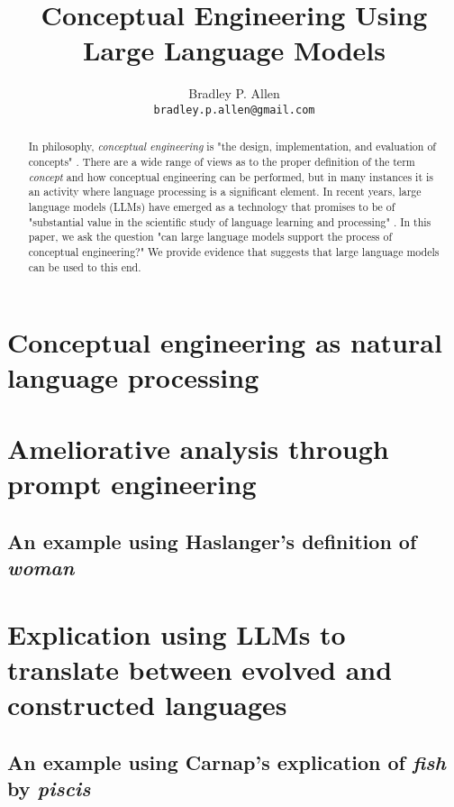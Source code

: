 \documentclass{article}
\title{Conceptual Engineering Using Large Language Models}
\author{Bradley P. Allen\\
\texttt{bradley.p.allen@gmail.com} \\
}
\begin{document}
\maketitle

\begin{abstract}
In philosophy, \textit{conceptual engineering} is "the design, implementation, and evaluation of concepts" \cite{chalmers2020conceptual}. There are a wide range of views as to the proper definition of the term \textit{concept} and how conceptual engineering can be performed, but in many instances it is an activity where language processing is a significant element. In recent years, large language models (LLMs) have emerged as a technology that promises to be of "substantial value in the scientific study of language learning and processing" \cite{mahowald2023dissociating}.  In this paper, we ask the question "can large language models support the process of conceptual engineering?" We provide evidence that suggests that large language models can be used to this end. 
\end{abstract}


\section{Conceptual engineering as natural language processing}

\section{Ameliorative analysis through prompt engineering}

\subsection{An example using Haslanger's definition of \textit{woman}}

\section{Explication using LLMs to translate between evolved and constructed languages}

\subsection{An example using Carnap's explication of \textit{fish} by \textit{piscis}}
\end{document}
